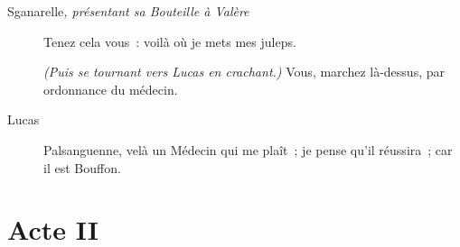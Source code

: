 \documentclass[french,twoside]{book} %
\begin{document}
 \begin{description} \item[Sganarelle\textit{, présentant sa Bouteille à Valère}\par
] 

Tenez cela vous : voilà où je mets mes juleps.

\textit{(Puis se tournant vers Lucas en crachant.)} Vous, marchez là-dessus, par ordonnance du médecin.\end{description}
 \begin{description} \item[Lucas] 

Palsanguenne, velà un Médecin qui me plaît ; je pense qu’il réussira ; car il est Bouffon.\end{description}
\section[{Acte II}]{Acte II}
\label{II}\renewcommand{\leftmark}{Acte II}
\end{document}
